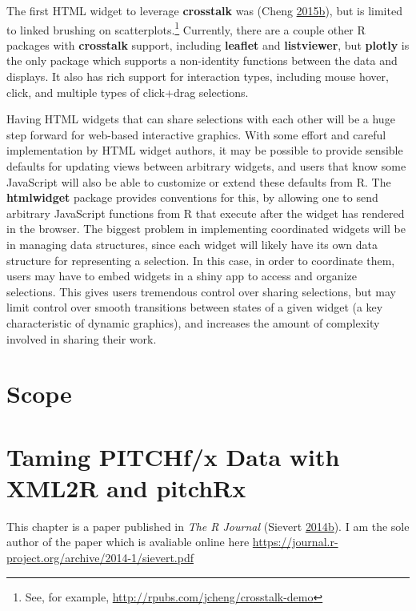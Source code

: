 \documentclass[12pt,]{isuthesis}
\let\rmarkdownfootnote\footnote%
\def\footnote{\protect\rmarkdownfootnote}
\begin{document}
The first HTML widget to leverage \textbf{crosstalk} was (Cheng
\protect\hyperlink{ref-d3scatter}{2015}\protect\hyperlink{ref-d3scatter}{b}),
but is limited to linked brushing on scatterplots.\footnote{See, for
  example, \url{http://rpubs.com/jcheng/crosstalk-demo}} Currently,
there are a couple other R packages with \textbf{crosstalk} support,
including \textbf{leaflet} and \textbf{listviewer}, but \textbf{plotly}
is the only package which supports a non-identity functions between the
data and displays. It also has rich support for interaction types,
including mouse hover, click, and multiple types of click+drag
selections.

Having HTML widgets that can share selections with each other will be a
huge step forward for web-based interactive graphics. With some effort
and careful implementation by HTML widget authors, it may be possible to
provide sensible defaults for updating views between arbitrary widgets,
and users that know some JavaScript will also be able to customize or
extend these defaults from R. The \textbf{htmlwidget} package provides
conventions for this, by allowing one to send arbitrary JavaScript
functions from R that execute after the widget has rendered in the
browser. The biggest problem in implementing coordinated widgets will be
in managing data structures, since each widget will likely have its own
data structure for representing a selection. In this case, in order to
coordinate them, users may have to embed widgets in a shiny app to
access and organize selections. This gives users tremendous control over
sharing selections, but may limit control over smooth transitions
between states of a given widget (a key characteristic of dynamic
graphics), and increases the amount of complexity involved in sharing
their work.

\chapter{Scope}

\chapter{Taming PITCHf/x Data with XML2R and pitchRx}

This chapter is a paper published in \emph{The R Journal} (Sievert
\protect\hyperlink{ref-Sievert:2014a}{2014}\protect\hyperlink{ref-Sievert:2014a}{b}).
I am the sole author of the paper which is avaliable online here
\url{https://journal.r-project.org/archive/2014-1/sievert.pdf}
\end{document}
